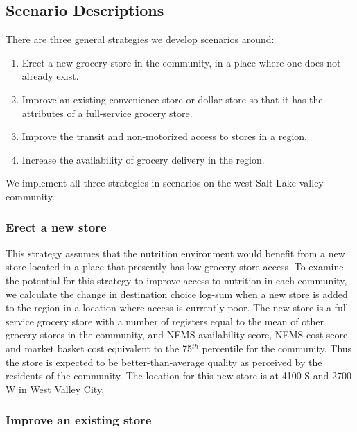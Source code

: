 \documentclass[
  letterpaper,
  number,
  review,
  3p]{elsarticle}
\providecommand{\tightlist}{%
  \setlength{\itemsep}{0pt}\setlength{\parskip}{0pt}}\usepackage{longtable,booktabs,array}
\begin{document}
\subsection{Scenario Descriptions}\label{scenario-descriptions}

There are three general strategies we develop scenarios around:

\begin{enumerate}
\def\labelenumi{\arabic{enumi}.}
\tightlist
\item
  Erect a new grocery store in the community, in a place where one does
  not already exist.
\item
  Improve an existing convenience store or dollar store so that it has
  the attributes of a full-service grocery store.
\item
  Improve the transit and non-motorized access to stores in a region.
\item
  Increase the availability of grocery delivery in the region.
\end{enumerate}

We implement all three strategies in scenarios on the west Salt Lake
valley community.

\subsubsection{Erect a new store}\label{erect-a-new-store}

This strategy assumes that the nutrition environment would benefit from
a new store located in a place that presently has low grocery store
access. To examine the potential for this strategy to improve access to
nutrition in each community, we calculate the change in destination
choice log-sum when a new store is added to the region in a location
where access is currently poor. The new store is a full-service grocery
store with a number of registers equal to the mean of other grocery
stores in the community, and NEMS availability score, NEMS cost score,
and market basket cost equivalent to the 75\(^{th}\) percentile for the
community. Thus the store is expected to be better-than-average quality
as perceived by the residents of the community. The location for this
new store is at 4100 S and 2700 W in West Valley City.

\subsubsection{Improve an existing
store}\label{improve-an-existing-store}
\end{document}
